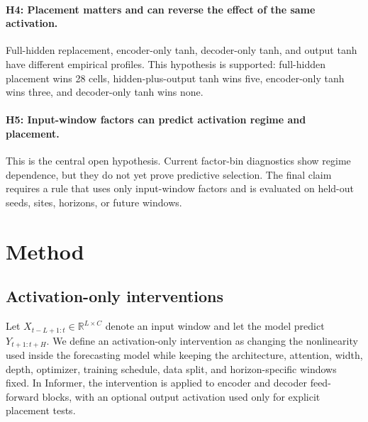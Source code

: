 \documentclass{article}
\begin{document}
\paragraph{H4: Placement matters and can reverse the effect of the same activation.}
Full-hidden replacement, encoder-only tanh, decoder-only tanh, and output tanh have different empirical profiles. This hypothesis is supported: full-hidden placement wins 28 cells, hidden-plus-output tanh wins five, encoder-only tanh wins three, and decoder-only tanh wins none.

\paragraph{H5: Input-window factors can predict activation regime and placement.}
This is the central open hypothesis. Current factor-bin diagnostics show regime dependence, but they do not yet prove predictive selection. The final claim requires a rule that uses only input-window factors and is evaluated on held-out seeds, sites, horizons, or future windows.

\section{Method}

\subsection{Activation-only interventions}

Let \(X_{t-L+1:t}\in\mathbb{R}^{L\times C}\) denote an input window and let the model predict \(Y_{t+1:t+H}\). We define an activation-only intervention as changing the nonlinearity used inside the forecasting model while keeping the architecture, attention, width, depth, optimizer, training schedule, data split, and horizon-specific windows fixed. In Informer, the intervention is applied to encoder and decoder feed-forward blocks, with an optional output activation used only for explicit placement tests.
\end{document}
